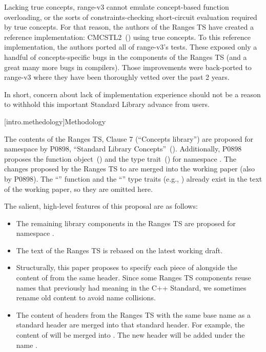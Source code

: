 \pnum
Lacking true concepts, range-v3 cannot emulate concept-based function
overloading, or the sorts of constraints-checking short-circuit evaluation
required by true concepts. For that reason, the authors of the Ranges TS have
created a reference implementation: CMCSTL2~(\cite{cmcstl2}) using true concepts. To
this reference implementation, the authors ported all of range-v3's tests. These
exposed only a handful of concepts-specific bugs in the components of the Ranges
TS (and a great many more bugs in compilers). Those improvements were back-ported
to range-v3 where they have been thoroughly vetted over the past 2 years.

\pnum
In short, concern about lack of implementation experience should not be a reason
to withhold this important Standard Library advance from users.

[intro.methedology]{Methodology} %

\pnum
The contents of the Ranges TS, Clause 7 (``Concepts library'') are proposed
for namespace  by P0898, ``Standard Library Concepts''~(\cite{P0898}).
Additionally, P0898 proposes the  function
object~() and the  type
trait~() for namespace . The changes proposed by
the Ranges TS to  are merged into the working paper (also
by P0898). The ``'' function and the ``'' type
traits (e.g., ) already exist in the text of the
working paper, so they are omitted here.

\pnum
The salient, high-level features of this proposal are as follows:

\begin{itemize}
\item The remaining library components in the Ranges TS are proposed for
namespace .

\item The text of the Ranges TS is rebased on the latest working draft.

\item Structurally, this paper proposes to specify each piece of 
alongside the content of  from the same header. Since some Ranges
TS components reuse names that previously had meaning in the C++ Standard, we
sometimes rename old content to avoid name collisions.

\item The content of headers from the Ranges TS with the same base name as a
standard header are merged into that standard header. For example, the content
of  will be merged into .
The new header  will be added under the name
.
\end{itemize}

